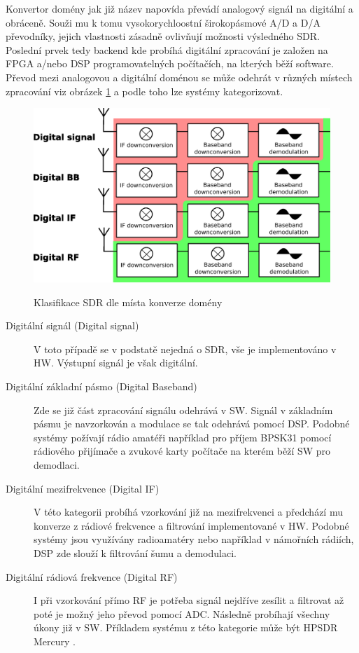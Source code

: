 \documentclass{ctuthesis}
\begin{document}
Konvertor domény jak již název napovída převádí analogový signál na digitální a obráceně. Souži mu k tomu vysokorychloostní širokopásmové A/D a D/A převodníky, jejich vlastnosti zásadně ovlivňují možnosti výsledného SDR. \\
 Poslední prvek tedy backend kde probíhá digitální zpracování je založen na FPGA a/nebo DSP programovatelných počítačích, na kterých běží software.\\
Převod mezi analogovou a digitální  doménou se může odehrát v různých místech zpracování viz obrázek  \ref{SDRconversion} a podle toho lze systémy kategorizovat.
\begin{figure}
\caption{Klasifikace SDR dle místa konverze domény\cite{andrasretzler2014}}
\includegraphics[width=1\textwidth]{./images/SDRconversion.png}
\label{SDRconversion}
\end{figure}
\begin{description}
\item[Digitální signál (Digital signal)]
V toto případě se v podstatě nejedná o SDR, vše je implementováno v HW. Výstupní signál je však digitální.
\item[Digitální základní pásmo (Digital Baseband)]
Zde se již část zpracování signálu odehrává v SW. Signál v základním pásmu je navzorkován a modulace se tak odehrává pomocí DSP. Podobné systémy požívají rádio amatéři například pro příjem BPSK31 pomocí rádiového přijímače a zvukové karty počítače na kterém běží SW pro demodlaci.
\item[Digitální mezifrekvence (Digital IF)]
V této kategorii probíhá vzorkování již na mezifrekvenci a předchází mu konverze z rádiové frekvence a filtrování implementované v HW. Podobné systémy jsou využívány radioamatéry nebo například v námořních rádiích, DSP zde slouží k filtrování šumu a demodulaci. 
\item[Digitální rádiová frekvence (Digital RF)]
I při vzorkování přímo RF je potřeba signál nejdříve zesílit a filtrovat až poté je možný jeho převod pomocí ADC. Následně probíhají všechny úkony již v SW. Příkladem systému z této kategorie může být HPSDR Mercury \cite{tapr} .
\end{description}
\end{document}
